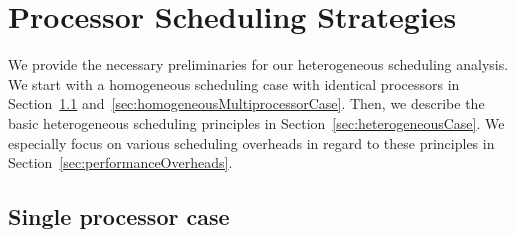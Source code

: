 \chapter{Processor Scheduling Strategies}
\label{chap:processorSchedulingStrategies}
We provide the necessary preliminaries for our heterogeneous scheduling analysis. We start with a homogeneous scheduling case with identical processors in Section~\ref{sec:singleProcessor} and~\ref{sec:homogeneousMultiprocessorCase}. Then, we describe the basic heterogeneous scheduling principles in Section~\ref{sec:heterogeneousCase}. We especially focus on various scheduling overheads in regard to these principles in Section~\ref{sec:performanceOverheads}.


\section{Single processor case}
\label{sec:singleProcessor}

